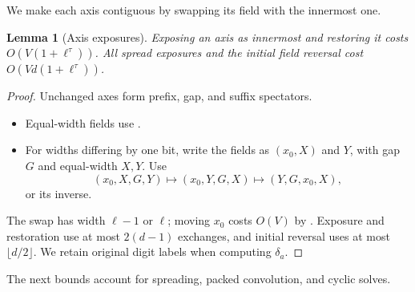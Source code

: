 \documentclass[11pt]{article}
\newtheorem{lemma}[theorem]{Lemma}
\theoremstyle{definition}
\renewcommand{\label}[1]{}%
\begin{document}
We make each axis contiguous by swapping its field with the innermost one.

\begin{lemma}[Axis exposures]\label{lem:axis-swap}
Exposing an axis as innermost and restoring it costs $O(V(1+\ell^\tau))$.
All spread exposures and the initial field reversal cost $O(Vd(1+\ell^\tau))$.
\end{lemma}
\begin{proof}
Unchanged axes form prefix, gap, and suffix spectators.
\begin{itemize}[leftmargin=*,nosep]
\item Equal-width fields use .
\item For widths differing by one bit, write the fields as $(x_0,X)$ and $Y$,
with gap $G$ and equal-width $X,Y$. Use
\[
 (x_0,X,G,Y)\longmapsto(x_0,Y,G,X)\longmapsto(Y,G,x_0,X),
\]
or its inverse.
\end{itemize}
The swap has width $\ell-1$ or $\ell$; moving $x_0$ costs $O(V)$ by
.
Exposure and restoration use at most $2(d-1)$ exchanges, and initial reversal
uses at most $\lfloor d/2\rfloor$.
We retain original digit labels when computing $\delta_a$.
\end{proof}

The next bounds account for spreading, packed convolution, and cyclic solves.
\end{document}
